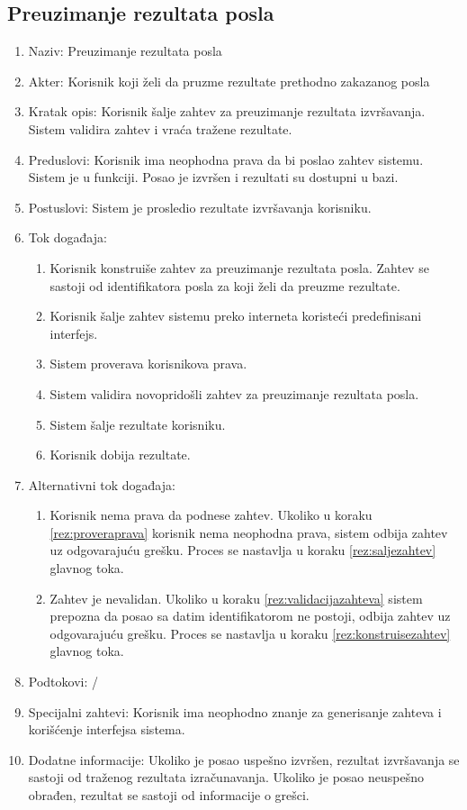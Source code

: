 \documentclass[12pt,oneside]{memoir}
\begin{document}
\subsection{Preuzimanje rezultata posla}
\begin{enumerate}
\item Naziv: Preuzimanje rezultata posla
\item Akter: Korisnik koji želi da pruzme rezultate prethodno zakazanog posla
\item Kratak opis: Korisnik šalje zahtev za preuzimanje rezultata izvršavanja. Sistem validira zahtev i vraća tražene rezultate.
\item Preduslovi: Korisnik ima neophodna prava da bi poslao zahtev sistemu. Sistem je u funkciji. Posao je izvršen i rezultati su dostupni u bazi.
\item Postuslovi: Sistem je prosledio rezultate izvršavanja korisniku.
\item Tok događaja:
	\begin{enumerate}
	\item \label{rez:konstruisezahtev} Korisnik konstruiše zahtev za preuzimanje rezultata posla. Zahtev se sastoji od identifikatora posla za koji želi da preuzme rezultate.
	\item \label{rez:saljezahtev} Korisnik šalje zahtev sistemu preko interneta koristeći predefinisani interfejs.
	\item \label{rez:proveraprava} Sistem proverava korisnikova prava.
	\item \label{rez:validacijazahteva} Sistem validira novopridošli zahtev za preuzimanje rezultata posla.
	\item \label{rez:sinhslanjerez} Sistem šalje rezultate korisniku.
	\item Korisnik dobija rezultate.
	\end{enumerate}
\item Alternativni tok događaja:
	\begin{enumerate}
	\item Korisnik nema prava da podnese zahtev. Ukoliko u koraku \ref{rez:proveraprava} korisnik nema neophodna prava, sistem odbija zahtev uz odgovarajuću grešku. Proces se nastavlja u koraku \ref{rez:saljezahtev} glavnog toka.
	\item Zahtev je nevalidan. Ukoliko u koraku \ref{rez:validacijazahteva} sistem prepozna da posao sa datim identifikatorom ne postoji, odbija zahtev uz odgovarajuću grešku. Proces se nastavlja u koraku \ref{rez:konstruisezahtev} glavnog toka.
	\end{enumerate}
\item Podtokovi: /
\item Specijalni zahtevi: Korisnik ima neophodno znanje za generisanje zahteva i korišćenje interfejsa sistema.
\item Dodatne informacije: Ukoliko je posao uspešno izvršen, rezultat izvršavanja se sastoji od traženog rezultata izračunavanja. Ukoliko je posao neuspešno obrađen, rezultat se sastoji od informacije o grešci.
\end{enumerate}
\end{document}
